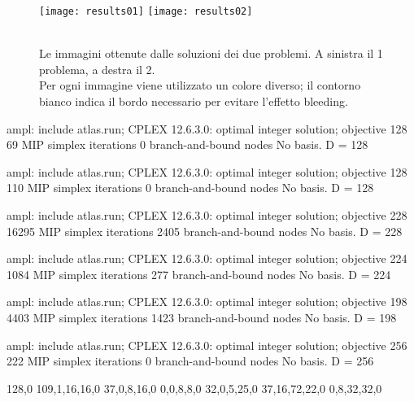 \begin{figure}[h!]
{\centering
	\texttt{[image: results01]}
	\hspace{1cm}
	\texttt{[image: results02]}
	\caption{\\Le immagini ottenute dalle soluzioni dei due problemi. 
	 A sinistra il 1\degree{} problema, a destra il 2\degree. \\
	 { %
	 Per ogni immagine viene utilizzato un colore diverso; il contorno bianco indica il bordo necessario per evitare l'effetto bleeding.
	 } } }
\end{figure}


\fi






\iffalse

ampl: include atlas.run;
CPLEX 12.6.3.0: optimal integer solution; objective 128
69 MIP simplex iterations
0 branch-and-bound nodes
No basis.
D = 128

ampl: include atlas.run;
CPLEX 12.6.3.0: optimal integer solution; objective 128
110 MIP simplex iterations
0 branch-and-bound nodes
No basis.
D = 128

ampl: include atlas.run;
CPLEX 12.6.3.0: optimal integer solution; objective 228
16295 MIP simplex iterations
2405 branch-and-bound nodes
No basis.
D = 228

ampl: include atlas.run;
CPLEX 12.6.3.0: optimal integer solution; objective 224
1084 MIP simplex iterations
277 branch-and-bound nodes
No basis.
D = 224

ampl: include atlas.run;
CPLEX 12.6.3.0: optimal integer solution; objective 198
4403 MIP simplex iterations
1423 branch-and-bound nodes
No basis.
D = 198

ampl: include atlas.run;
CPLEX 12.6.3.0: optimal integer solution; objective 256
222 MIP simplex iterations
0 branch-and-bound nodes
No basis.
D = 256
























128,0
109,1,16,16,0
37,0,8,16,0
0,0,8,8,0
32,0,5,25,0
37,16,72,22,0
0,8,32,32,0

